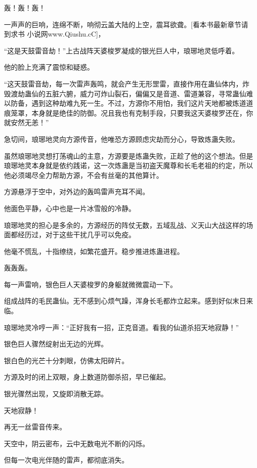 
\begin{this_body}

轰！轰！轰！

一声声的巨响，连绵不断，响彻云盖大陆的上空，震耳欲聋。[看本书最新章节请到求书 小说网www.Qiushu.cC]，

“这是天鼓雷音劫！”上古战阵天婆梭罗凝成的银光巨人中，琅琊地灵低呼着。

他的脸上充满了震惊和疑惑。

“这天鼓雷音劫，每一次雷声轰鸣，就会产生无形罡雷，直接作用在蛊仙体内，炸毁渡劫蛊仙的五脏六腑，威力可炸山裂石，偏偏又是音道、雷道兼容，寻常蛊仙难以防备，遇到这种劫难九死一生。不过，方源你不用怕，我们这片天地都被炼道道痕笼罩，本身就是绝佳的防御。况且我也有克制手段，只要我这天婆梭罗还在，你就安然无恙！”

急切间，琅琊地灵向方源传音，他唯恐方源顾虑灾劫而分心，导致炼蛊失败。

虽然琅琊地灵想打荡魂山的主意，方源要是炼蛊失败，正趁了他的这个想法。但是琅琊地灵本身就是依约践诺，这一次炼蛊是当初盗天魔尊和长毛老祖的约定，所以他必须竭尽全力帮助方源，不会有丝毫的其他算计。

方源悬浮于空中，对外边的轰鸣雷声充耳不闻。

他面色平静，心中也是一片冰雪般的冷静。

琅琊地灵的担心是多余的，方源经历的阵仗无数，五域乱战、义天山大战这样的场面都经历过，对于这些干扰几乎可以免疫。

他毫不慌乱，十指缭绕，如繁花盛开。稳步推进炼蛊进程。

轰轰轰。

每一声雷响，银色巨人天婆梭罗的身躯就微微震动一下。

组成战阵的毛民蛊仙。无不感到心烦气躁，浑身长毛都炸立起来。感到好似末日来临。

琅琊地灵冷哼一声：“正好我有一招，正克音道。看我的仙道杀招天地寂静！”

银色巨人骤然绽射出无边的光辉。

银白色的光芒十分刺眼，仿佛太阳碎片。

方源及时的闭上双眼，身上数道防御杀招，早已催起。

银光骤然出现，又旋即消散无踪。

天地寂静！

再无一丝雷音传来。

天空中，阴云密布，云中无数电光不断的闪烁。

但每一次电光伴随的雷声，都彻底消失。


\end{this_body}
